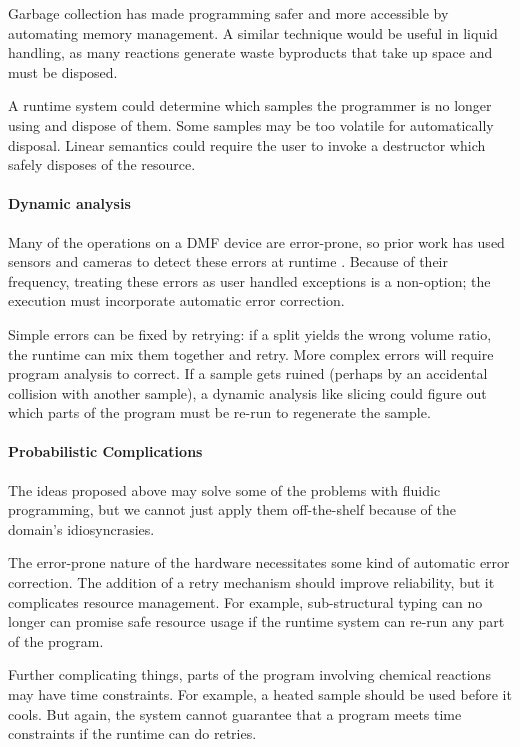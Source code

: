 \documentclass[
  10pt,
  a4paper,
  twocolumn,
]{article}
\begin{document}
Garbage collection has made programming safer and more accessible by automating memory management.
A similar technique would be useful in liquid handling, as many reactions generate waste byproducts that take up space and must be disposed.

A runtime system could determine which samples the programmer is no longer using and dispose of them.
Some samples may be too volatile for automatically disposal.
Linear semantics could require the user to invoke a destructor which safely disposes of the resource.

\paragraph{Dynamic analysis}

Many of the operations on a DMF device are error-prone, so prior work has used sensors and cameras
to detect these errors at runtime \cite{dmf-vision}. Because of their frequency, treating these errors as
user handled exceptions is a non-option; the execution must incorporate automatic error correction.

Simple errors can be fixed by retrying: if a split yields the wrong volume ratio, the runtime can mix them together and retry.
More complex errors will require program analysis to correct. If a sample gets ruined (perhaps by an accidental collision with
another sample), a dynamic analysis like slicing could figure out which parts of the program must be re-run to regenerate the sample.

\paragraph{Probabilistic Complications}

The ideas proposed above may solve some of the problems with fluidic programming, but we cannot just apply them off-the-shelf because of the domain's idiosyncrasies.

The error-prone nature of the hardware necessitates some kind of
automatic error correction. The addition of a retry mechanism should improve reliability, but it complicates resource management. For example, sub-structural typing can no longer can promise safe resource usage if the runtime system can re-run any part of the program.

Further complicating things, parts of the program involving chemical reactions may have time constraints.
For example, a heated sample should be used before it cools.
But again, the system cannot guarantee that a program meets time constraints if the runtime can do retries.
\end{document}
